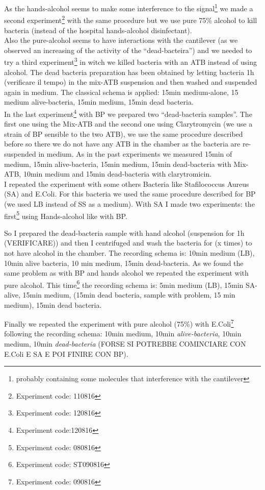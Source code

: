 \documentclass[11pt, a4paper]{article}
\begin{document}
As the hands-alcohol seems to make some interference to the signal\footnote{probably containing some molecules that interference with the cantilever} we made a second experiment\footnote{Experiment code: 110816} with the same procedure but we use pure 75\% alcohol to kill bacteria (instead of the hospital hands-alcohol disinfectant).\\
Also the pure-alcohol seems to have interactions with the cantilever (as we observed an increasing of the activity of the “dead-bacteira”) and we needed to try a third experiment\footnote{Experiment code: 120816}  in witch we killed bacteria with an ATB instead of using alcohol. The dead bacteria preparation has been obtained by letting bacteria 1h (verificare il tempo) in the mix-ATB suspension and then washed and suspended again in medium. The classical schema is applied: 15min medium-alone, 15 medium alive-bacteria, 15min medium, 15min dead bacteria. \\
In the last experiment\footnote{Experiment code:120816} with BP we prepared two “dead-bacteria samples”. The first one using the Mix-ATB and the second one using Clarytromycin (we use a strain of BP sensible to the two ATB), we use the same procedure described before so there we do not have any ATB in the chamber as the bacteria are re-suspended in medium. As in the past experiments we measured 15min of medium, 15min alive-bacteria, 15min medium, 15min dead-bacteria with Mix-ATB, 10min medium and 15min dead-bacteria with clarytromicin. 
\\I repeated the experiment with some others Bacteria like Stafilococcus Aureus (SA) and E.Coli. For this bacteria we used the same procedure described for BP (we used LB instead of SS as a medium). With SA I made two experiments: the first\footnote{Experiment code: 080816} using Hands-alcohol like with BP. 

So I prepared the dead-bacteria sample with hand alcohol (suspension for 1h (VERIFICARE)) and then I centrifuged and wash the bacteria for (x times) to not have alcohol in the chamber. The recording schema is: 10min medium (LB), 10min alive bacteria, 10 min medium, 15min dead-bacteria. As we found the same problem as with BP and hands alcohol we repeated the experiment with pure alcohol. 
This time\footnote{Experiment code: ST090816} the recording schema is:  5min medium (LB), 15min SA-alive, 15min medium, (15min dead bacteria, sample with problem, 15 min medium), 15min dead bacteria. 
 
Finally we repeated the experiment with pure alcohol (75\%) with E.Coli\footnote{Experiment code: 090816} following the recording schema: 10min medium, 10min \textit{alive-bacteria}, 10min medium, 10min \textit{dead-bacteria}
(FORSE SI POTREBBE COMINCIARE CON E.Coli E SA E POI FINIRE CON BP).
\end{document}
